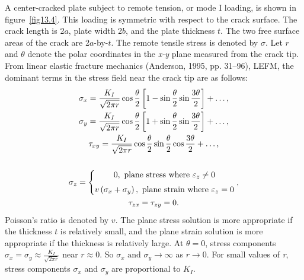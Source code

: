 \documentclass{AeroStructure-ERJohnson}
\begin{document}
A center-cracked plate subject to remote tension, or mode I loading, is shown in figure~\ref{fig13.4}. This loading is symmetric with respect to the crack surface. The crack length is 2$a$, plate width 2$b$, and the plate thickness $t$. The two free surface areas of the crack are 2$a$-by-$t$. The remote tensile stress is denoted by $\sigma$. Let $r$ and $\theta$ denote the polar coordinates in the \textit{x-y} plane measured from the crack tip. From linear elastic fracture mechanics (Anderson, 1995, pp. 31--96), LEFM, the dominant terms in the stress field near the crack tip are as follows:
\begin{gather}
\sigma_{x}=\frac{K_{I}}{\sqrt{2 \pi r}} \cos \frac{\theta}{2}\left[1-\sin \frac{\theta}{2} \sin \frac{3 \theta}{2}\right]+\ldots, \label{eq13.3} \\
\sigma_{y}=\frac{K_{I}}{\sqrt{2 \pi r}} \cos \frac{\theta}{2}\left[1+\sin \frac{\theta}{2} \sin \frac{3 \theta}{2}\right]+\ldots, \label{eq13.4} \\
\tau_{x y}=\frac{K_{I}}{\sqrt{2 \pi r}} \cos \frac{\theta}{2} \sin \frac{\theta}{2} \cos \frac{3 \theta}{2}+\ldots, \label{eq13.5} \\
\nonumber\\
\sigma_{z}=\left\{\begin{array}{@{}c@{}}0, \text { plane stress where } \varepsilon_{z} \neq 0 \\[6pt]
v\left(\sigma_{x}+\sigma_{y}\right), \text { plane strain where } \varepsilon_{z}=0\end{array}\right., \label{eq13.6} \\
\tau_{z x}=\tau_{z y}=0. \label{eq13.7}
\end{gather}
Poisson's ratio is denoted by $v$. The plane stress solution is more appropriate if the thickness $t$ is relatively small, and the plane strain solution is more appropriate if the thickness is relatively large. At $\theta=0$, stress components $\sigma_{x}=\sigma_{y} \approx \frac{K_{I}}{\sqrt{2 \pi r}}$ near $r \approx 0$. So $\sigma_{x} \text { and } \sigma_{y} \rightarrow \infty$ as $r \rightarrow 0$. For small values of \textit{r}, stress components $\sigma_{x}$ and $\sigma_{y}$ are proportional to $K_{I}$.

\end{document}
